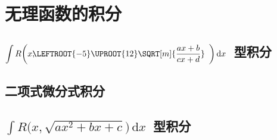 \section{无理函数的积分}
\subsection{$\displaystyle\int R\biggl(x,\kern-1ex\LEFTROOT{-5}\UPROOT{12}\SQRT[m]{\frac{\smash[b]{ax+b}}{\smash[b]{cx+d}}}\enspace\biggr)\,\mathrm dx$~型积分}
\subsection{二项式微分式积分}
\subsection{$\displaystyle\int R\bigl(x,\sqrt{ax^2+bx+c}\bigr)\,\mathrm dx$~型积分}
\begin{exercise}

\end{exercise}
\begin{exercise*}

\end{exercise*}


\endinput
